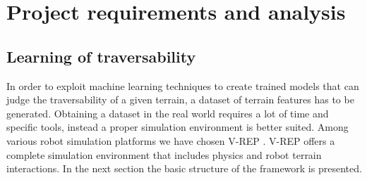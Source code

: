 \documentclass[]{usiinfbachelorproject}
\begin{document}
\newpage
\section{Project requirements and analysis}
\subsection{Learning of traversability}
In order to exploit machine learning techniques to create trained models that can judge the traversability of a given terrain, a dataset of terrain features has to be generated.
Obtaining a dataset in the real world requires a lot of time and specific tools, instead a proper simulation environment is better suited. Among various
robot simulation platforms we have chosen V-REP \cite{vrep}. V-REP offers a complete simulation environment that includes physics and
robot terrain interactions. In the next section the basic structure of the framework is presented.
\end{document}
